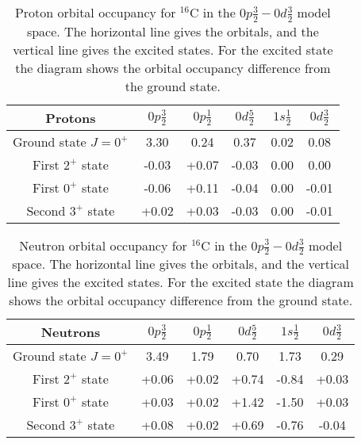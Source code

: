 \begin{table}
\begin{center}
\begin{tabular}{|c|c|c|c|c|c|}
	\hline
	Protons & $0p\frac32$ & $0p\frac12$ & $0d\frac52$ & $1s\frac12$ & $0d\frac32$ \\
	\hline
	Ground state $J = 0^+$ & 3.30 & 0.24 & 0.37 & 0.02 & 0.08 \\
	\hline
	First $2^+$ state & -0.03 & +0.07 & -0.03 & 0.00 & 0.00 \\
	\hline
	First $0^+$ state & -0.06 & +0.11 & -0.04 & 0.00 & -0.01 \\
	\hline
	Second $3^+$ state & +0.02 & +0.03 & -0.03 & 0.00 & -0.01 \\
	\hline
\end{tabular}
\caption{Proton orbital occupancy for $^{16}$C in the $0p\frac32-0d\frac32$ model space. The horizontal line gives the orbitals, and the vertical line gives the excited states. For the excited state the diagram shows the orbital occupancy difference from the ground state.}
\label{C16_0d3_p}
\end{center}
\end{table}

\begin{table}
\begin{center}
\begin{tabular}{|c|c|c|c|c|c|}
	\hline
	Neutrons & $0p\frac32$ & $0p\frac12$ & $0d\frac52$ & $1s\frac12$ & $0d\frac32$ \\
	\hline
	Ground state $J=0^+$ & 3.49 & 1.79 & 0.70 & 1.73 & 0.29 \\
	\hline
	First $2^+$ state & +0.06 & +0.02 & +0.74 & -0.84 & +0.03 \\
	\hline
	First $0^+$ state & +0.03 & +0.02 & +1.42 & -1.50 & +0.03 \\
	\hline
	Second $3^+$ state & +0.08 & +0.02 & +0.69 & -0.76 & -0.04 \\
	\hline
\end{tabular}
\caption{Neutron orbital occupancy for $^{16}$C in the $0p\frac32-0d\frac32$ model space. The horizontal line gives the orbitals, and the vertical line gives the excited states. For the excited state the diagram shows the orbital occupancy difference from the ground state.}
\label{C16_0d3_n}
\end{center}
\end{table}

